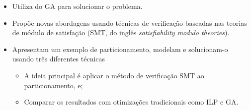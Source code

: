    \begin{frame}{\cite{Trindade2016}} \vspace{-1em}
      \begin{itemize}
         \setlength{\itemsep}{1.8em}
         \item Utiliza do GA para solucionar o problema.
         
         \item Propõe novas abordagens usando técnicas de verificação baseadas nas teorias de módulo de satisfação (SMT, do inglês \textit{satisfiability modulo theories}). 
         
         \item Apresentam um exemplo de particionamento, modelam e solucionam-o usando três diferentes técnicas
         \begin{itemize}
            \setlength{\itemsep}{1.0em}
            \item A ideia principal é aplicar o método de verificação SMT ao particionamento, e;
            \item Comparar os resultados com otimizações tradicionais como ILP e GA.
         \end{itemize}
         
      \end{itemize}
   \end{frame}


